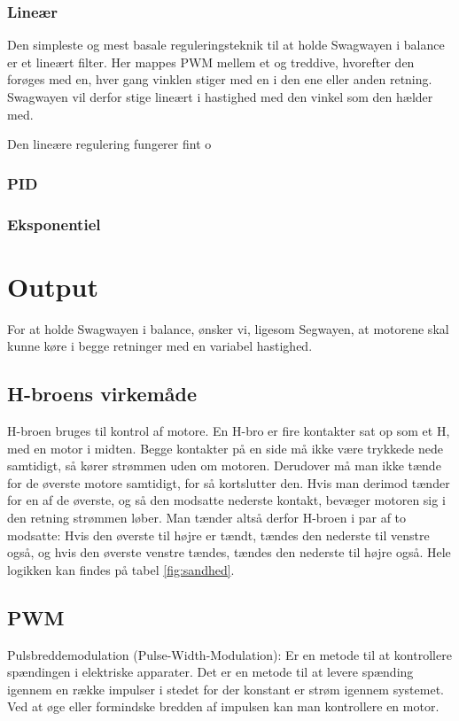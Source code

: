 \documentclass[a4paper,oneside,article,danish,table]{memoir}
\begin{document}
\subsection{Lineær}
Den simpleste og mest basale reguleringsteknik til at holde Swagwayen i balance er et lineært filter. Her mappes PWM mellem et og treddive, hvorefter den forøges med en, hver gang vinklen stiger med en i den ene eller anden retning. Swagwayen vil derfor stige lineært i hastighed med den vinkel som den hælder med.

Den lineære regulering fungerer fint o
\subsection{PID}
\subsection{Eksponentiel}

\chapter{Output}
For at holde Swagwayen i balance, ønsker vi, ligesom Segwayen, at motorene skal kunne køre i begge retninger med en variabel hastighed.
\section{H-broens virkemåde} 
\label{sec:H-broen}
H-broen bruges til kontrol af motore. 
En H-bro er fire kontakter sat op som et H, med en motor i midten. Begge kontakter på en side må ikke være trykkede nede samtidigt, så kører strømmen uden om motoren. Derudover må man ikke tænde for de øverste motore samtidigt, for så kortslutter den. Hvis man derimod tænder for en af de øverste, og så den modsatte nederste kontakt, bevæger motoren sig i den retning strømmen løber. Man tænder altså derfor H-broen i par af to modsatte: Hvis den øverste til højre er tændt, tændes den nederste til venstre også, og hvis den øverste venstre tændes, tændes den nederste til højre også. Hele logikken kan findes på tabel \ref{fig:sandhed}. 
\section{PWM}
Pulsbreddemodulation (Pulse-Width-Modulation): Er en metode til at kontrollere spændingen i elektriske
apparater. Det er en metode til at levere spænding igennem en række impulser i stedet for der konstant er strøm igennem systemet. Ved at øge eller formindske bredden af impulsen kan man kontrollere en motor.
\end{document}
